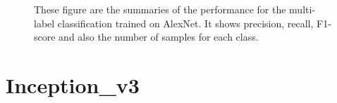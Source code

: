 \begin{figure}
\caption [Performance summary of the Components class trained on AlexNet]{These figure are the summaries of the performance for the multi-label classification trained on AlexNet. It shows precision, recall, F1-score and also the number of samples for each class.}
\label{fig:perf_al}
\end{figure}



\section{Inception\_v3}\label{sec:gogl}
